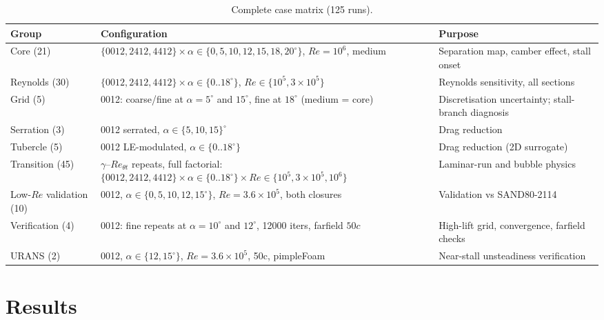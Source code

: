 \documentclass[11pt,a4paper]{article}
\begin{document}
\begin{table}[t]
  \centering
  \caption{Complete case matrix (125 runs).}
  \label{tab:matrix}
  \begin{tabular}{p{2.4cm}p{6.6cm}p{5.2cm}}
    \toprule
    Group & Configuration & Purpose \\
    \midrule
    Core (21) & $\{0012, 2412, 4412\} \times \alpha \in \{0,5,10,12,15,18,20^\circ\}$, $Re=10^6$, medium & Separation map, camber effect, stall onset \\
    Reynolds (30) & $\{0012, 2412, 4412\} \times \alpha \in \{0..18^\circ\}$, $Re \in \{10^5, 3\times10^5\}$ & Reynolds sensitivity, all sections \\
    Grid (5) & 0012: coarse/fine at $\alpha=5^\circ$ and $15^\circ$, fine at $18^\circ$ (medium = core) & Discretisation uncertainty; stall-branch diagnosis \\
    Serration (3) & 0012 serrated, $\alpha \in \{5,10,15\}^\circ$ & Drag reduction \\
    Tubercle (5) & 0012 LE-modulated, $\alpha \in \{0..18^\circ\}$ & Drag reduction (2D surrogate) \\
    Transition (45) & $\gamma$--$Re_{\theta t}$ repeats, full factorial: $\{0012, 2412, 4412\} \times \alpha \in \{0..18^\circ\} \times Re \in \{10^5, 3\times10^5, 10^6\}$ & Laminar-run and bubble physics \\
    Low-$Re$ validation (10) & 0012, $\alpha \in \{0,5,10,12,15^\circ\}$, $Re = 3.6\times10^5$, both closures & Validation vs SAND80-2114 \\
    Verification (4) & 0012: fine repeats at $\alpha=10^\circ$ and $12^\circ$, 12000 iters, farfield $50c$ & High-lift grid, convergence, farfield checks \\
    URANS (2) & 0012, $\alpha \in \{12,15^\circ\}$, $Re = 3.6\times10^5$, 50c, pimpleFoam & Near-stall unsteadiness verification \\
    \bottomrule
  \end{tabular}
\end{table}

\section{Results}\label{sec:results}
\end{document}
